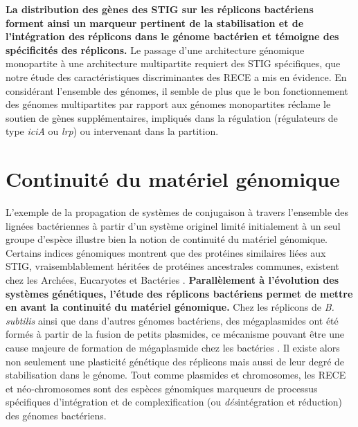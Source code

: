 	 \textbf{\color{orange} La distribution des gènes des STIG sur les réplicons bactériens forment ainsi un marqueur pertinent de la stabilisation et de l'intégration des réplicons dans le génome bactérien et témoigne des spécificités des réplicons.} Le passage d'une architecture génomique monopartite à une architecture multipartite requiert des STIG spécifiques, que notre étude des caractéristiques discriminantes des RECE a mis en évidence. En considérant l'ensemble des génomes, il semble de plus que le bon fonctionnement des génomes multipartites par rapport aux génomes monopartites réclame le soutien de gènes supplémentaires, impliqués dans la régulation (régulateurs de type \textit{iciA} ou \textit{lrp}) ou intervenant dans la partition.
	 
     
\section{Continuité du matériel génomique}\label{continuite}
     L'exemple de la propagation de systèmes de conjugaison à travers l'ensemble des lignées bactériennes à partir d'un système originel limité initialement à un seul groupe d'espèce illustre bien la notion de continuité du matériel génomique. Certains indices génomiques montrent que des protéines similaires liées aux STIG, vraisemblablement héritées de protéines ancestrales communes, existent chez les Archées, Eucaryotes et Bactéries \citep{mcgeoch2008extra}. \textbf{\color{orange} Parallèlement à l'évolution des systèmes génétiques, l'étude des réplicons bactériens permet de mettre en avant la continuité du matériel génomique.} Chez les réplicons de \textit{B. subtilis} ainsi que dans d'autres génomes bactériens, des mégaplasmides ont été formés à partir de la fusion de petits plasmides, ce mécanisme pouvant être une cause majeure de formation de mégaplasmide chez les bactéries \citep{zheng2013evolution}. Il existe alors non seulement une plasticité génétique des réplicons mais aussi de leur degré de stabilisation dans le génome. Tout comme plasmides et chromosomes, les RECE et néo-chromosomes sont des espèces génomiques marqueurs de processus spécifiques d'intégration et de complexification (ou \textit{dés}intégration et réduction) des génomes bactériens.  
     
